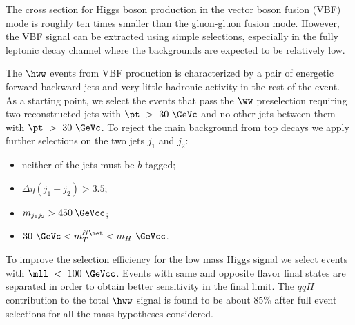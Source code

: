 The cross section for Higgs boson production in the vector boson fusion (VBF)
mode is roughly ten times smaller than the gluon-gluon fusion mode.
However, the VBF signal can be extracted
using simple selections, especially in the fully leptonic decay channel
where the backgrounds are expected to be relatively low.

The $\hww$ events from VBF production is characterized by a pair of energetic 
forward-backward jets and very little hadronic activity in the rest of the event. 
As a starting point, we select the events that pass the $\ww$ preselection 
requiring two reconstructed jets with $\pt~>~30~\GeVc$ and no other jets between 
them with $\pt~>~30~\GeVc$. To reject the main background from top decays we 
apply further selections on the two jets $j_1$ and $j_2$:
\begin{itemize}
  \item neither of the jets must be $b$-tagged;
  \item $\Delta\eta (j_1-j_2) > 3.5$;
  \item $m_{j_1j_2} > 450\:\GeVcc$;
  \item $30~\GeVc < m_{T}^{\ell\ell\met} < m_H~\GeVcc$.
\end{itemize}
To improve the selection efficiency for the low mass Higgs signal we select 
events with $\mll~<~100~\GeVcc$. Events with same and opposite flavor final states 
are separated in order to obtain better sensitivity in the final limit.   
The $qqH$ contribution to the total  $\hww$ signal is found to be about 85\%
after full event selections for all the mass hypotheses considered. 
